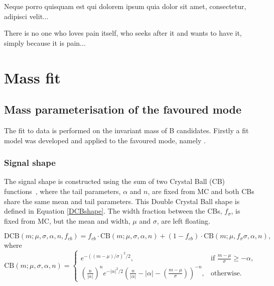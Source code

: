 \clearpage
\begin{savequote}[8cm]
\textlatin{Neque porro quisquam est qui dolorem ipsum quia dolor sit amet, consectetur, adipisci velit...}

There is no one who loves pain itself, who seeks after it and wants to have it, simply because it is pain...
\end{savequote}

\chapter{\label{ch:5-massfit}Mass fit} 

\minitoc

\section{Mass parameterisation of the favoured mode}
\label{sec:massfit}

The fit to data is performed on the invariant mass of B candidates. Firstly a fit model was developed and applied to the favoured mode, namely \decay{\Bm}{\D(\Km\pip)\Kstarm}.

\subsection{Signal shape}
\label{sec:massfit:signal}

The signal shape is constructed using the sum of two Crystal Ball (CB) functions~\cite{Skwarnicki:1986xj}, where the tail parameters, $\alpha$ and $n$, are fixed from MC and both CBs share the same mean and tail parameters. This Double Crystal Ball shape is defined in Equation \ref{DCBshape}. The width fraction between the CBs, $f_{\sigma}$, is fixed from MC, but the mean and width, $\mu$ and $\sigma$, are left floating. 

\begin{equation}
\mathrm{DCB}(m; \mu,\sigma,\alpha,n,f_{cb}) = f_{cb} \cdot \mathrm{CB}(m; \mu,\sigma,\alpha,n) + (1-f_{cb}) \cdot \mathrm{CB}(m;\mu,f_{\sigma}\sigma,\alpha,n),
\label{DCBshape}
\end{equation}
where
\begin{equation*}
  \mathrm{CB}(m; \mu,\sigma,\alpha,n)=
\begin{cases}
    e^{-((m-\mu)/ \sigma)^2/2},                                   & \text{if } \frac{m-\mu}{\sigma} \geq - \alpha, \\
   \left ( \frac{n}{|\alpha|} \right ) ^n e^{-|\alpha|^2/2} \left ( \frac{n}{|\alpha|} - |\alpha| - \left ( \frac{m-\mu}{\sigma} \right ) \right ) ^{-n} ,    & \text{otherwise.}
\end{cases}
\end{equation*}


